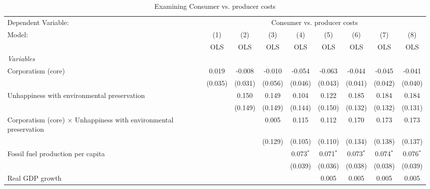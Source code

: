 
\begin{table}[htbp]
   \caption{Examining Consumer vs. producer costs}
   \centering
   \begin{tabular}{lcccccccc}
      \toprule
      Dependent Variable: & \multicolumn{8}{c}{Consumer vs. producer costs}\\
      Model:                                                                   & (1)     & (2)     & (3)     & (4)         & (5)         & (6)         & (7)         & (8)\\  
                                                                               &  OLS    & OLS     & OLS     & OLS         & OLS         & OLS         & OLS         & OLS\\  
      \midrule
      \emph{Variables}\\
      Corporatism (core)                                                       & 0.019   & -0.008  & -0.010  & -0.054      & -0.063      & -0.044      & -0.045      & -0.041\\   
                                                                               & (0.035) & (0.031) & (0.056) & (0.046)     & (0.043)     & (0.041)     & (0.042)     & (0.040)\\   
      Unhappiness with environmental preservation                              &         & 0.150   & 0.149   & 0.104       & 0.122       & 0.185       & 0.184       & 0.184\\   
                                                                               &         & (0.149) & (0.149) & (0.144)     & (0.150)     & (0.132)     & (0.132)     & (0.131)\\   
      Corporatism (core) $\times$ Unhappiness with environmental preservation  &         &         & 0.005   & 0.115       & 0.112       & 0.170       & 0.173       & 0.173\\   
                                                                               &         &         & (0.129) & (0.105)     & (0.110)     & (0.134)     & (0.138)     & (0.137)\\   
      Fossil fuel production per capita                                        &         &         &         & 0.073$^{*}$ & 0.071$^{*}$ & 0.073$^{*}$ & 0.074$^{*}$ & 0.076$^{*}$\\   
                                                                               &         &         &         & (0.039)     & (0.036)     & (0.038)     & (0.038)     & (0.039)\\   
      Real GDP growth                                                          &         &         &         &             & 0.005       & 0.005       & 0.005       & 0.005\\   

\end{tabular}
\end{table}
